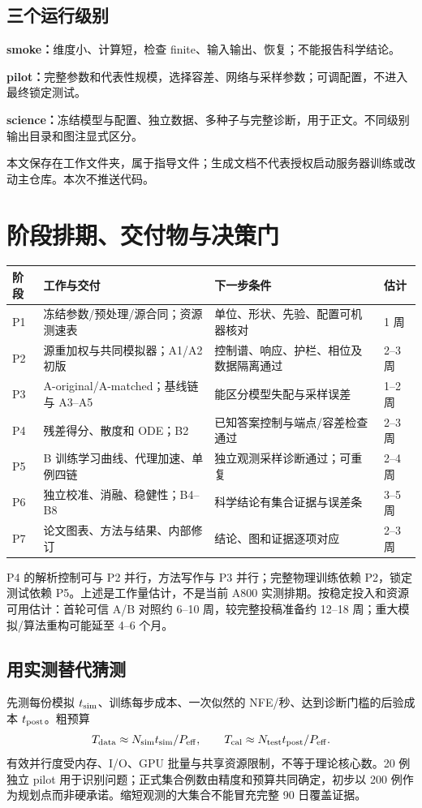 \documentclass[UTF8,fontset=none,a4paper,11pt]{ctexart}
\newcommand{\chapterpage}[1]{\section{#1}}
\begin{document}
\subsection{三个运行级别}
\textbf{smoke：}维度小、计算短，检查 finite、输入输出、恢复；不能报告科学结论。\par
\textbf{pilot：}完整参数和代表性规模，选择容差、网络与采样参数；可调配置，不进入最终锁定测试。\par
\textbf{science：}冻结模型与配置、独立数据、多种子与完整诊断，用于正文。不同级别输出目录和图注显式区分。
\par 本文保存在工作文件夹，属于指导文件；生成文档不代表授权启动服务器训练或改动主仓库。本次不推送代码。
\chapterpage{阶段排期、交付物与决策门}
\begin{longtable}{p{15mm}p{52mm}p{61mm}p{16mm}}\toprule
阶段 & 工作与交付 & 下一步条件 & 估计\\\midrule\endhead
P1 & 冻结参数/预处理/源合同；资源测速表 & 单位、形状、先验、配置可机器核对 & 1 周\\
P2 & 源重加权与共同模拟器；A1/A2 初版 & 控制谱、响应、护栏、相位及数据隔离通过 & 2--3 周\\
P3 & A-original/A-matched；基线链与 A3--A5 & 能区分模型失配与采样误差 & 1--2 周\\
P4 & 残差得分、散度和 ODE；B2 & 已知答案控制与端点/容差检查通过 & 2--3 周\\
P5 & B 训练学习曲线、代理加速、单例四链 & 独立观测采样诊断通过；可重复 & 2--4 周\\
P6 & 独立校准、消融、稳健性；B4--B8 & 科学结论有集合证据与误差条 & 3--5 周\\
P7 & 论文图表、方法与结果、内部修订 & 结论、图和证据逐项对应 & 2--3 周\\\bottomrule
\end{longtable}
P4 的解析控制可与 P2 并行，方法写作与 P3 并行；完整物理训练依赖 P2，锁定测试依赖 P5。上述是工作量估计，不是当前 A800 实测排期。按稳定投入和资源可用估计：首轮可信 A/B 对照约 6--10 周，较完整投稿准备约 12--18 周；重大模拟/算法重构可能延至 4--6 个月。
\subsection{用实测替代猜测}
先测每份模拟 $t_{\rm sim}$、训练每步成本、一次似然的 NFE/秒、达到诊断门槛的后验成本 $t_{\rm post}$。粗预算
\begin{equation}
T_{\rm data}\approx N_{\rm sim}t_{\rm sim}/P_{\rm eff},\qquad
T_{\rm cal}\approx N_{\rm test}t_{\rm post}/P_{\rm eff}.
\end{equation}
有效并行度受内存、I/O、GPU 批量与共享资源限制，不等于理论核心数。20 例独立 pilot 用于识别问题；正式集合例数由精度和预算共同确定，初步以 200 例作为规划点而非硬承诺。缩短观测的大集合不能冒充完整 90 日覆盖证据。
\end{document}
